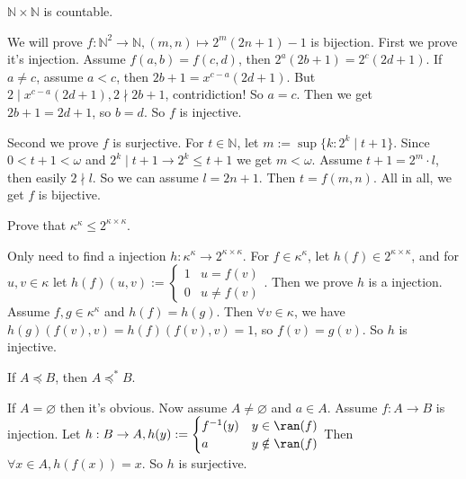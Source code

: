 \documentclass{ctexart}
\begin{document}
\begin{problem}
 $\mathbb{N} \times \mathbb{N}$ is countable.
\end{problem}

\begin{solution}
 We will prove $f:\mathbb{N}^2\to \mathbb{N},(m,n)\mapsto 2^m(2n+1)-1$ is bijection. First we prove it's injection. Assume $f(a,b)=f(c,d)$, then $2^a(2b+1)=2^c(2d+1)$. If $a\neq c$, assume $a<c$, then $2b+1=x^{c-a}(2d+1)$. But $2\mid x^{c-a}(2d+1),2\nmid 2b+1$, contridiction! So $a=c$. Then we get $2b+1=2d+1$, so $b=d$. So $f$ is injective. 

 Second we prove $f$ is surjective. For $t\in \mathbb{N}$, let $m:=\sup\{k:2^k\mid t+1\}$. Since $0<t+1<\omega$ and $2^k\mid t+1\to 2^k\leq t+1$ we get $m<\omega$. Assume $t+1=2^m\cdot l$, then easily $2\nmid l$. So we can assume $l=2n+1$. Then $t=f(m,n)$. 
 All in all, we get $f$ is bijective.
\end{solution}

\begin{problem}
 Prove that $\kappa^\kappa \leq 2^{\kappa \times \kappa}$.
\end{problem}

\begin{solution}
 Only need to find a injection $h:\kappa^\kappa\to 2^{\kappa\times \kappa}$. For $f\in \kappa^\kappa$, let $h(f)\in 2^{\kappa\times \kappa}$, and for $u,v\in \kappa$ let $h(f)(u,v):=\begin{cases}
  1 & u= f(v)\\
  0 & u\neq f(v)
 \end{cases}$. Then we prove $h$ is a injection. Assume $f,g\in \kappa^\kappa$ and $h(f)=h(g)$. Then $\forall v\in \kappa$, we have $h(g)(f(v),v)=h(f)(f(v),v)=1$, so $f(v)=g(v)$. So $h$ is injective. 
\end{solution}

\begin{problem}
 If $A \preccurlyeq B$, then $A \preccurlyeq^* B$.
\end{problem}

\begin{solution}
 If $A=\varnothing$ then it's obvious. Now assume $A\neq \varnothing$ and $a\in A$. Assume $f:A\to B$ is injection. Let $h:B\to A,h(y):=\begin{cases}
  f^{-1}(y) & y\in \ran(f)\\
  a & y\notin \ran(f)
 \end{cases}$
 Then $\forall x\in A,h(f(x))=x$. So $h$ is surjective. 
\end{solution}
\end{document}
